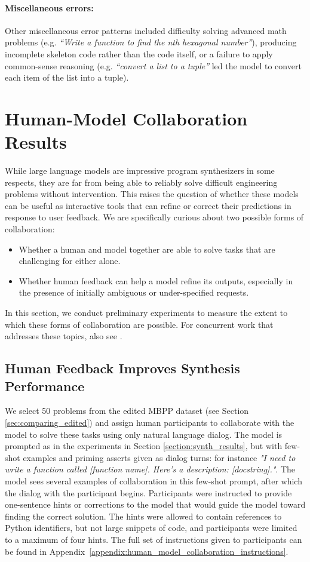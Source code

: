 \paragraph{Miscellaneous errors:} Other miscellaneous error patterns included difficulty solving advanced math problems (e.g. \textit{``Write a function to find the nth hexagonal number”}), producing incomplete skeleton code rather than the code itself, or a failure to apply common-sense reasoning (e.g. \textit{``convert a list to a tuple”} led the model to convert each item of the list into a tuple).

\section{Human-Model Collaboration Results}
\label{section:code_dialog}
While large language models are impressive program synthesizers in some respects, they are far from being able to reliably solve difficult engineering problems without intervention. This raises the question of whether these models can be useful as interactive tools that can refine or correct their predictions in response to user feedback. We are specifically curious about two possible forms of collaboration:

\begin{itemize}
    \item Whether a human and model together are able to solve tasks that are challenging for either alone.
    \item Whether human feedback can help a model refine its outputs, especially in the presence of initially ambiguous or under-specified requests.
\end{itemize}

In this section, we conduct preliminary experiments to measure the extent to which these forms of collaboration are possible. For concurrent work that addresses these topics, also see \cite{uist}.

\subsection{Human Feedback Improves Synthesis Performance}
\label{sec:dialog_numbers}

We select 50 problems from the edited MBPP dataset (see Section \ref{sec:comparing_edited}) and assign human participants to collaborate with the model to solve these tasks using only natural language dialog. The model is prompted as in the experiments in Section \ref{section:synth_results}, but with few-shot examples and priming asserts given as dialog turns: for instance \textit{"I need to write a function called [function name]. Here's a description: [docstring]."}. The model sees several examples of collaboration in this few-shot prompt, after which the dialog with the participant begins. Participants were instructed to provide one-sentence hints or corrections to the model that would guide the model toward finding the correct solution. The hints were allowed to contain references to Python identifiers, but not large snippets of code, and participants were limited to a maximum of four hints. The full set of instructions given to participants can be found in Appendix~\ref{appendix:human_model_collaboration_instructions}. 

